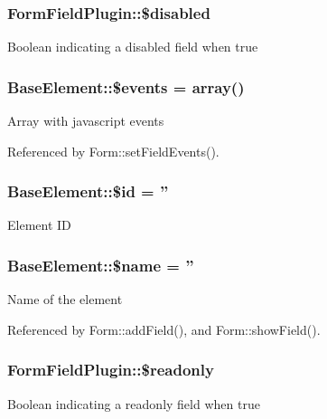\subsubsection[{\$disabled}]{\setlength{\rightskip}{0pt plus 5cm}FormFieldPlugin::\$disabled}\label{classFormFieldPlugin_a2e589ab9610052dfbba6170d6117be37}
Boolean indicating a disabled field when true 
\subsubsection[{\$events}]{\setlength{\rightskip}{0pt plus 5cm}BaseElement::\$events = array()}\label{classBaseElement_a02cebe45d277b4ff8f29db08bad371ba}
Array with javascript events 

Referenced by Form::setFieldEvents().

\subsubsection[{\$id}]{\setlength{\rightskip}{0pt plus 5cm}BaseElement::\$id = ''}\label{classBaseElement_a11b6989c43b53869a09f5ce65aa55b45}
Element ID 
\subsubsection[{\$name}]{\setlength{\rightskip}{0pt plus 5cm}BaseElement::\$name = ''}\label{classBaseElement_a30b8cff187a9de659a70daf287d66f45}
Name of the element 

Referenced by Form::addField(), and Form::showField().

\subsubsection[{\$readonly}]{\setlength{\rightskip}{0pt plus 5cm}FormFieldPlugin::\$readonly}\label{classFormFieldPlugin_a707acf02de21b2b7975b2aa362615ce0}
Boolean indicating a readonly field when true 
